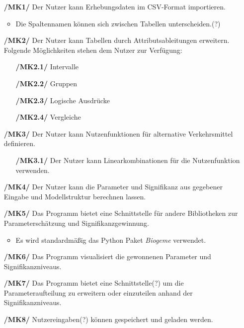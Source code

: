 \documentclass{article}
\begin{document}
\begin{itemize}
    \item[\textbf{/MK1/}] Der Nutzer kann Erhebungsdaten im CSV-Format importieren.
    \begin{itemize}
        \item Die Spaltennamen können sich zwischen Tabellen unterscheiden.(?)
    \end{itemize}
    \item[\textbf{/MK2/}] Der Nutzer kann Tabellen durch Attributsableitungen erweitern.
    \subitem Folgende Möglichkeiten stehen dem Nutzer zur Verfügung:
    \begin{itemize}[leftmargin=.7in]
        \item[\textbf{/MK2.1/}] Intervalle
        \item[\textbf{/MK2.2/}] Gruppen
        \item[\textbf{/MK2.3/}] Logische Ausdrücke
        \item[\textbf{/MK2.4/}] Vergleiche
    \end{itemize}
    \item[\textbf{/MK3/}] Der Nutzer kann Nutzenfunktionen für alternative Verkehrsmittel definieren.
    \begin{itemize}[leftmargin=.7in]
        \item[\textbf{/MK3.1/}] Der Nutzer kann Linearkombinationen für die Nutzenfunktion verwenden.
    \end{itemize}
    \item[\textbf{/MK4/}] Der Nutzer kann die Parameter und Signifikanz aus gegebener Eingabe und Modellstruktur berechnen lassen.
    \item[\textbf{/MK5/}] Das Programm bietet eine Schnittstelle für andere Bibliotheken zur Parameterschätzung und Signifikanzgewinnung. 
    \begin{itemize}
        \item Es wird standardmäßig das Python Paket \textit{Biogeme} verwendet.
    \end{itemize}
    \item[\textbf{/MK6/}] Das Programm visualisiert die gewonnenen Parameter und Signifikanzniveaus.
    \item[\textbf{/MK7/}] Das Programm bietet eine Schnittstelle(?) um die Parameteraufteilung zu erweitern oder einzuteilen anhand der Signifikanzniveaus.
    \item[\textbf{/MK8/}] Nutzereingaben(?) können gespeichert und geladen werden.
\end{itemize}
\end{document}
